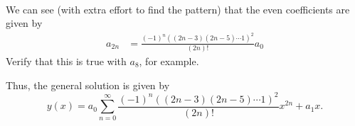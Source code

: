 \documentclass[11pt]{article}
\begin{document}
\begin{solution}
\begin{align*}
\end{align*}
We can see (with extra effort to find the pattern) that the even coefficients are given by
\begin{align*}
a_{2n} & = \frac{(-1)^{n}((2n-3)(2n-5)\cdots 1)^{2}}{(2n)!}a_{0} 
\end{align*}
Verify that this is true with $a_{8}$, for example.

Thus, the general solution is given by
\begin{equation*}
\boxed{y(x)=a_{0}\sum_{n=0}^{\infty} \frac{(-1)^{n}((2n-3)(2n-5)\cdots 1)^{2}}{(2n)!} x^{2n} + a_{1}x.}
\end{equation*}




\end{solution}
\end{document}
